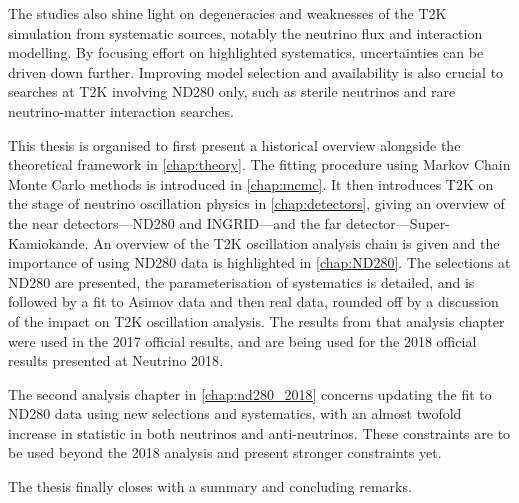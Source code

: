 The studies also shine light on degeneracies and weaknesses of the T2K simulation from systematic sources, notably the neutrino flux and interaction modelling. By focusing effort on highlighted systematics, uncertainties can be driven down further. Improving model selection and availability is also crucial to searches at T2K involving ND280 only, such as sterile neutrinos and rare neutrino-matter interaction searches.

This thesis is organised to first present a historical overview alongside the theoretical framework in \autoref{chap:theory}. The fitting procedure using Markov Chain Monte Carlo methods is introduced in \autoref{chap:mcmc}. It then introduces T2K on the stage of neutrino oscillation physics in \autoref{chap:detectors}, giving an overview of the near detectors---ND280 and INGRID---and the far detector---Super-Kamiokande. An overview of the T2K oscillation analysis chain is given and the importance of using ND280 data is highlighted in \autoref{chap:ND280}. The selections at ND280 are presented, the parameterisation of systematics is detailed, and is followed by a fit to Asimov data and then real data, rounded off by a discussion of the impact on T2K oscillation analysis. The results from that analysis chapter were used in the 2017 official results\cite{t2k_2017}, and are being used for the 2018 official results presented at Neutrino 2018\cite{t2k_neutrino2018}.

The second analysis chapter in \autoref{chap:nd280_2018} concerns updating the fit to ND280 data using new selections and systematics, with an almost twofold increase in statistic in both neutrinos and anti-neutrinos. These constraints are to be used beyond the 2018 analysis and present stronger constraints yet.

The thesis finally closes with a summary and concluding remarks.
